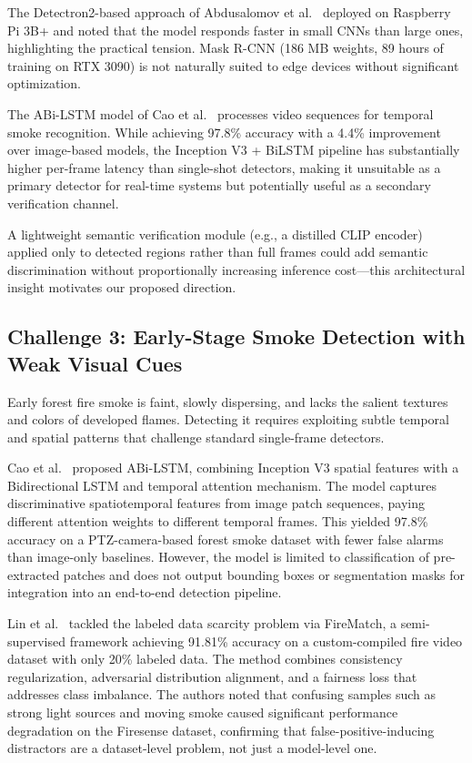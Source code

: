 \documentclass[11pt,twocolumn]{article}
\begin{document}
The Detectron2-based approach of Abdusalomov et al.~\cite{detectron2fire} deployed on Raspberry Pi 3B+ and noted that the model responds faster in small CNNs than large ones, highlighting the practical tension. Mask R-CNN (186 MB weights, 89 hours of training on RTX 3090) is not naturally suited to edge devices without significant optimization.

The ABi-LSTM model of Cao et al.~\cite{bilstm_smoke} processes video sequences for temporal smoke recognition. While achieving 97.8\% accuracy with a 4.4\% improvement over image-based models, the Inception V3 + BiLSTM pipeline has substantially higher per-frame latency than single-shot detectors, making it unsuitable as a primary detector for real-time systems but potentially useful as a secondary verification channel.

A lightweight semantic verification module (e.g., a distilled CLIP encoder) applied only to detected regions rather than full frames could add semantic discrimination without proportionally increasing inference cost---this architectural insight motivates our proposed direction.

\subsection{Challenge 3: Early-Stage Smoke Detection with Weak Visual Cues}

Early forest fire smoke is faint, slowly dispersing, and lacks the salient textures and colors of developed flames. Detecting it requires exploiting subtle temporal and spatial patterns that challenge standard single-frame detectors.

Cao et al.~\cite{bilstm_smoke} proposed ABi-LSTM, combining Inception V3 spatial features with a Bidirectional LSTM and temporal attention mechanism. The model captures discriminative spatiotemporal features from image patch sequences, paying different attention weights to different temporal frames. This yielded 97.8\% accuracy on a PTZ-camera-based forest smoke dataset with fewer false alarms than image-only baselines. However, the model is limited to classification of pre-extracted patches and does not output bounding boxes or segmentation masks for integration into an end-to-end detection pipeline.

Lin et al.~\cite{firematch} tackled the labeled data scarcity problem via FireMatch, a semi-supervised framework achieving 91.81\% accuracy on a custom-compiled fire video dataset with only 20\% labeled data. The method combines consistency regularization, adversarial distribution alignment, and a fairness loss that addresses class imbalance. The authors noted that confusing samples such as strong light sources and moving smoke caused significant performance degradation on the Firesense dataset, confirming that false-positive-inducing distractors are a dataset-level problem, not just a model-level one.
\end{document}
